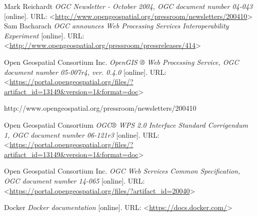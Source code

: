 \documentclass[12pt,a4paper]{article}
\begin{document}
\newpage
\begin{thebibliography}{99}
\label{Bibliography}
Mark Reichardt \textit{OGC Newsletter - October 2004, OGC document number 04-043} [online].
URL: \textless\url{http://www.opengeospatial.org/pressroom/newsletters/200410}\textgreater
{}
Sam Bacharach \textit{OGC announces Web Processing Services Interoperability Experiment} [online].
URL: \textless\url{http://www.opengeospatial.org/pressroom/pressreleases/414}\textgreater

Open Geospatial Consortium Inc. \textit{OpenGIS ® Web Processing Service, OGC document number 05-007r4, ver. 0.4.0} [online].
URL: \textless\url{https://portal.opengeospatial.org/files/?artifact_id=13149&version=1&format=doc}\textgreater

http://www.opengeospatial.org/pressroom/newsletters/200410

Open Geospatial Consortium \textit{OGC® WPS 2.0 Interface Standard Corrigendum 1, OGC document number 06-121r3} [online].
URL: \textless\url{https://portal.opengeospatial.org/files/?artifact_id=13149&version=1&format=doc}\textgreater

Open Geospatial Consortium Inc. \textit{OGC Web Services Common Specification, OGC document number 14-065} [online].
URL: \textless\url{https://portal.opengeospatial.org/files/?artifact_id=20040}\textgreater

Docker \textit{Docker documentation} [online].
URL: \textless\url{https://docs.docker.com/}\textgreater

\end{thebibliography}
\end{document}
